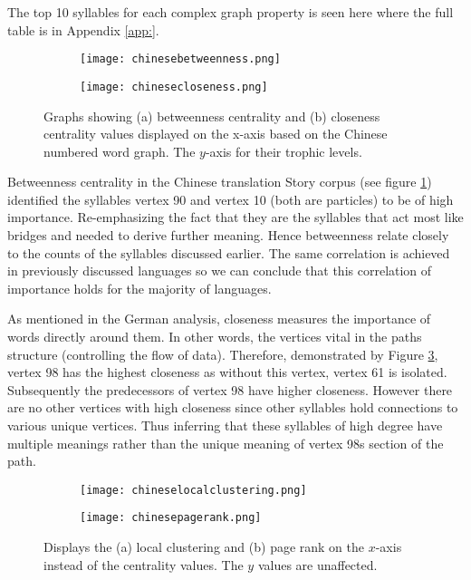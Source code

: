 The top 10 syllables for each complex graph property is seen here where the full table is in Appendix \ref{app:}.

\begin{figure}[!htb]
\centering
\begin{subfigure}{.45\textwidth}
	\hspace{-1cm} 
	\texttt{[image: chinesebetweenness.png]}
	\caption{}
	\label{fig:cnbc}
\end{subfigure}
\hfill
\begin{subfigure}{.45\textwidth}
	\hspace{-1cm} 
	\texttt{[image: chinesecloseness.png]}
	\caption{ }
	\label{fig:cncc}
\end{subfigure}
\caption{Graphs showing (a) betweenness centrality and (b) closeness centrality values displayed on the x-axis based on the Chinese numbered word graph. The $y$-axis for their trophic levels.}
\label{fig:cncentrality}
\end{figure}

Betweenness centrality in the Chinese translation Story corpus (see figure \ref{fig:cnbc}) identified the syllables vertex 90 and vertex 10 (both are particles) to be of high importance. Re-emphasizing the fact that they are the syllables that act most like bridges and needed to derive further meaning. Hence betweenness relate closely to the counts of the syllables discussed earlier. The same correlation is achieved in previously discussed languages so we can conclude that this correlation of importance holds for the majority of languages.

As mentioned in the German analysis, closeness measures the importance of words directly around them. In other words, the vertices vital in the paths structure (controlling the flow of data). Therefore, demonstrated by Figure \ref{fig:cncentrality}, vertex 98 has the highest closeness as without this vertex, vertex 61 is isolated. Subsequently the predecessors of vertex 98 have higher closeness. However there are no other vertices with high closeness since other syllables hold connections to various unique vertices. Thus inferring that these syllables of high degree have multiple meanings rather than the unique meaning of vertex 98s section of the path.

\begin{figure}[!htb]
\centering
\begin{subfigure}{.45\textwidth}
	\hspace{-1cm} 
	\texttt{[image: chineselocalclustering.png]}
	\caption{}
	\label{fig:cnlc}
\end{subfigure}
\hfill
\begin{subfigure}{.45\textwidth}
	\hspace{-1cm} 
	\texttt{[image: chinesepagerank.png]}
	\caption{}
	\label{fig:cnpr}
\end{subfigure}
\caption{Displays the (a) local clustering and (b) page rank on the $x$-axis instead of the centrality values. The $y$ values are unaffected.}
\label{fig:cnother}
\end{figure}

